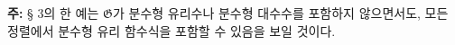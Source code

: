 
\textbf{주:} § 3의 한 예는 $\mathfrak G$가 분수형 유리수나 분수형 대수수를 포함하지 않으면서도, 모든 정렬에서 분수형 유리 함수식을 포함할 수 있음을 보일 것이다.

